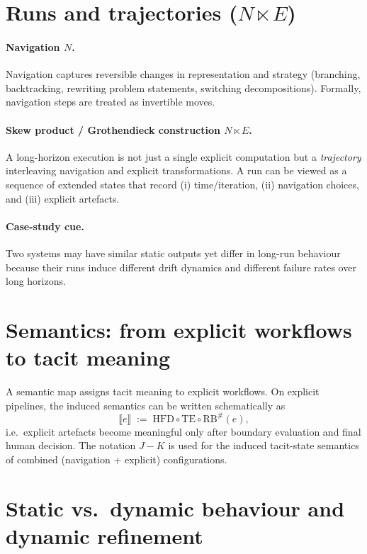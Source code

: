\section{Runs and trajectories ($N \ltimes E$)}
\label{sec:lookup-runs}

\paragraph{Navigation $N$.}
Navigation captures reversible changes in representation and strategy (branching, backtracking,
rewriting problem statements, switching decompositions). Formally, navigation steps are treated as
invertible moves.

\paragraph{Skew product / Grothendieck construction $N \ltimes E$.}
A long-horizon execution is not just a single explicit computation but a \emph{trajectory} interleaving
navigation and explicit transformations. A run can be viewed as a sequence of extended states that
record (i) time/iteration, (ii) navigation choices, and (iii) explicit artefacts.

\paragraph{Case-study cue.}
Two systems may have similar static outputs yet differ in long-run behaviour because their runs
induce different drift dynamics and different failure rates over long horizons.

\section{Semantics: from explicit workflows to tacit meaning}
\label{sec:lookup-semantics}

A semantic map assigns tacit meaning to explicit workflows. On explicit pipelines,
the induced semantics can be written schematically as
\[
\llbracket e \rrbracket \;:=\; \mathrm{HFD} \circ \mathrm{TE} \circ \mathrm{RB}^{\#}(e),
\]
i.e.\ explicit artefacts become meaningful only after boundary evaluation and final human decision.
The notation $J{-}K$ is used for the induced tacit-state semantics of combined (navigation + explicit)
configurations.

\section{Static vs.\ dynamic behaviour and dynamic refinement}
\label{sec:lookup-dynamics}

